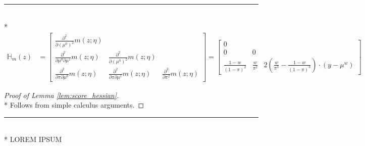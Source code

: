 \hrule

\begin{lem}\label{lem:score_hessian}\mbox{}\\*
    \begin{equation}
        \begin{aligned}
            \mathbb{H}_{m}(z)
            & = \begin{bmatrix}
                \frac{\partial^2}{\partial \left(\mu^{0}\right)^2} m\left(z; \eta\right)   & & \\
                \frac{\partial^2}{\partial \mu^{0} \partial \mu^{1}} m\left(z; \eta\right) & \frac{\partial^2}{\partial \left(\mu^{0}\right)^2} m\left(z; \eta\right) & \\
                \frac{\partial^2}{\partial \pi \partial \mu^{0}} m\left(z; \eta\right)     & \frac{\partial^2}{\partial \pi \partial \mu^{1}} m\left(z; \eta\right) & \frac{\partial^2}{\partial \pi^2} m\left(z; \eta\right)
            \end{bmatrix} 
            = \begin{bmatrix}
                0  & & \\
                0 & 0 & \\
                \frac{1-w}{\left(1-\pi\right)^{2}} & \frac{w}{\pi^2} & 2\left(\frac{w}{\pi^3} - \frac{1-w}{\left(1-\pi\right)^{3}}\right)  \cdot \left(y - \mu^{w}\right)
            \end{bmatrix}
        \end{aligned}
    \end{equation}
\end{lem}

\begin{proof}[Proof of Lemma \ref{lem:score_hessian}]\mbox{}\\*
    Follows from simple calculus arguments.
\end{proof}

\hrule

\begin{lem}\label{lem:score_2gateaux_derivative}\mbox{}\\*
    {\color{red} LOREM IPSUM}
\end{lem}

